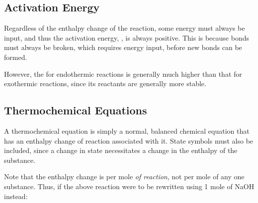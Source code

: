 

	\pagebreak
	\subsection{Activation Energy}

		Regardless of the enthalpy change of the reaction, some energy must always be input, and thus the activation energy, \ea, is
		always positive. This is because bonds must always be broken, which requires energy input, before new bonds can be formed.

		However, the \ea for endothermic reactions is generally much higher than that for exothermic reactions, since its reactants
		are generally more stable.


	\subsection{Thermochemical Equations}

		A thermochemical equation is simply a normal, balanced chemical equation that has an enthalpy change of reaction associated with
		it. State symbols must also be included, since a change in state necessitates a change in the enthalpy of the substance.


		Note that the enthalpy change is per mole \textit{of reaction}, not per mole of any one substance. Thus, if the above reaction
		were to be rewritten using 1 mole of NaOH instead:

